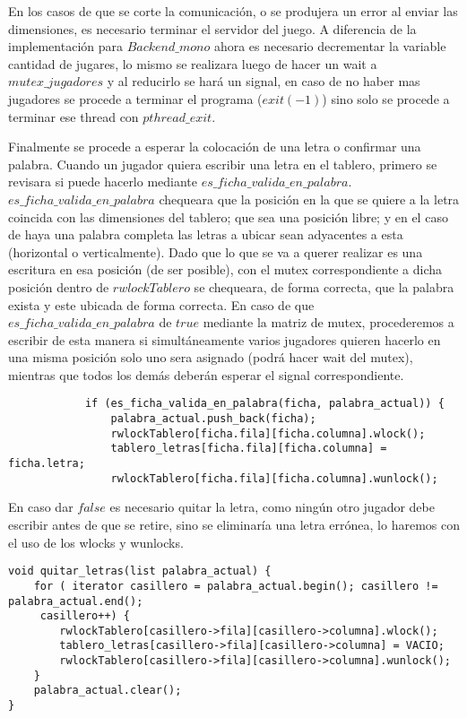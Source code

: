 En los casos de que se corte la comunicación, o se produjera un error al enviar las dimensiones, es necesario terminar el servidor del juego. A diferencia de la implementación para $Backend\_mono$ ahora es necesario decrementar la variable cantidad de jugares, lo mismo se realizara luego de hacer un wait a $mutex\_jugadores$ y al reducirlo se hará un signal, en caso de no haber mas jugadores se procede a terminar el programa ($exit(-1)$) sino solo se procede a terminar ese thread con $pthread\_exit$. 

Finalmente se procede a esperar la colocación de una letra o confirmar una palabra.
Cuando un jugador quiera escribir una letra en el tablero, primero se revisara si puede hacerlo mediante $es\_ficha\_valida\_en\_palabra$.  $es\_ficha\_valida\_en\_palabra$ chequeara que la posición en la que se quiere a la letra coincida con las dimensiones del  tablero; que sea una posición libre; y en el caso de haya una palabra completa las letras a ubicar sean adyacentes a esta (horizontal o verticalmente). Dado que lo que se va a querer realizar es una escritura en esa posición (de ser posible), con el mutex correspondiente a dicha posición dentro de $rwlockTablero$  se chequeara, de forma correcta, que la palabra exista y este ubicada de forma correcta. En caso de que $es\_ficha\_valida\_en\_palabra$ de $true$  mediante la matriz de mutex, procederemos a escribir de esta manera si simultáneamente varios jugadores quieren hacerlo en una misma posición solo uno sera asignado (podrá hacer wait del mutex), mientras que todos los demás deberán esperar el signal correspondiente. 
\begin{verbatim}
            if (es_ficha_valida_en_palabra(ficha, palabra_actual)) {
                palabra_actual.push_back(ficha);
                rwlockTablero[ficha.fila][ficha.columna].wlock();
                tablero_letras[ficha.fila][ficha.columna] = ficha.letra;
                rwlockTablero[ficha.fila][ficha.columna].wunlock(); 
\end{verbatim}
En caso dar $false$ es necesario quitar la letra, como ningún otro jugador debe escribir antes de que se retire, sino se eliminaría una letra errónea, lo haremos con el uso de los wlocks y wunlocks.
\begin{verbatim}
void quitar_letras(list palabra_actual) {
    for ( iterator casillero = palabra_actual.begin(); casillero != palabra_actual.end();
     casillero++) {
        rwlockTablero[casillero->fila][casillero->columna].wlock();
        tablero_letras[casillero->fila][casillero->columna] = VACIO;
        rwlockTablero[casillero->fila][casillero->columna].wunlock();
    }
    palabra_actual.clear();
}
\end{verbatim}
